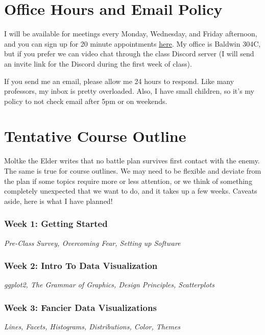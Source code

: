 \documentclass[11pt, letterpaper]{article}
\begin{document}
\section*{Office Hours and Email Policy}
I will be available for meetings every Monday, Wednesday, and Friday afternoon, and you can sign up for 20 minute appointments \href{https://calendly.com/joeornstein/20min}{here}. My office is Baldwin 304C, but if you prefer we can video chat through the class Discord server (I will send an invite link for the Discord during the first week of class).

If you send me an email, please allow me 24 hours to respond. Like many professors, my inbox is pretty overloaded. Also, I have small children, so it's my policy to not check email after 5pm or on weekends. 

\section*{Tentative Course Outline}

Moltke the Elder writes that no battle plan survives first contact with the enemy. The same is true for course outlines. We may need to be flexible and deviate from the plan if some topics require more or less attention, or we think of something completely unexpected that we want to do, and it takes up a few weeks. Caveats aside, here is what I have planned!

\subsubsection*{Week 1: Getting Started}
\textit{Pre-Class Survey, Overcoming Fear, Setting up Software}

\subsubsection*{Week 2: Intro To Data Visualization}
\textit{ggplot2, The Grammar of Graphics, Design Principles, Scatterplots}

\subsubsection*{Week 3: Fancier Data Visualizations}
\textit{Lines, Facets, Histograms, Distributions, Color, Themes}
\end{document}
